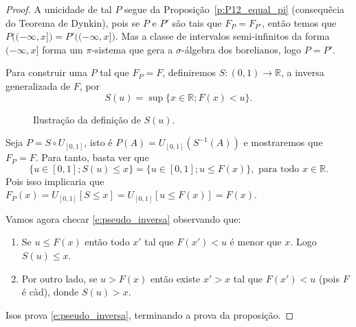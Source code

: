 \begin{proof}
  A unicidade de tal $P$ segue da Proposição~\ref{p:P12_equal_pi} (consequêcia do Teorema de Dynkin), pois se $P$ e $P'$ são tais que $F_{P} = F_{P'}$, então temos que $P\big( (-\infty, x] \big) = P'\big( (-\infty, x] \big)$.
  Mas a classe de intervalos semi-infinitos da forma $(-\infty, x]$ forma um $\pi$-sistema que gera a $\sigma$-álgebra dos borelianos, logo $P = P'$.

  Para construir uma $P$ tal que $F_P = F$, definiremos $S:(0,1) \to \mathbb{R}$, a inversa generalizada de $F$, por
  \begin{equation}
    S(u) = \sup \{x \in \mathbb{R}; F(x) < u\}.
  \end{equation}
  \begin{figure}[tb]
    \centering
    \caption{\small Ilustração da definição de $S(u)$.}
    \label{f:Rk_good}
  \end{figure}

  Seja $P = S \circ U_{[0,1]}$, isto é $P(A) = U_{[0,1]}(S^{-1}(A))$ e mostraremos que $F_P = F$.
  Para tanto, basta ver que
  \begin{equation}
    \label{e:pseudo_inversa}
    \{u \in [0,1]; S(u) \leq x\} = \{u \in [0,1]; u \leq F(x)\}, \text{ para todo $x \in \mathbb{R}$}.
  \end{equation}
  Pois isso implicaria que $F_P(x) = U_{[0,1]}[S \leq x] = U_{[0,1]} [u \leq F(x)] = F(x)$.

  Vamos agora checar \eqref{e:pseudo_inversa} observando que:
  \begin{enumerate}[\quad a)]
  \item Se $u \leq F(x)$ então todo $x'$ tal que $F(x') < u$ é menor que $x$.
    Logo $S(u) \leq x$.
  \item Por outro lado, se $u > F(x)$ então existe $x' > x$ tal que $F(x') < u$ (pois $F$ é càd), donde $S(u) > x$.
  \end{enumerate}
  Isos prova \eqref{e:pseudo_inversa}, terminando a prova da proposição.
\end{proof}

